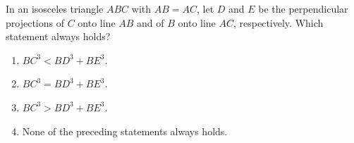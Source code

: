 In an isosceles triangle $ABC$ with $AB=AC$, let $D$ and $E$ be the perpendicular projections of $C$ onto line $AB$ and of $B$ onto line $AC$, respectively. Which statement always holds?
\begin{enumerate}
\item $BC^3<BD^3+BE^3$.
\item $BC^3=BD^3+BE^3$.
\item $BC^3>BD^3+BE^3$.
\item None of the preceding statements always holds.
\end{enumerate}

